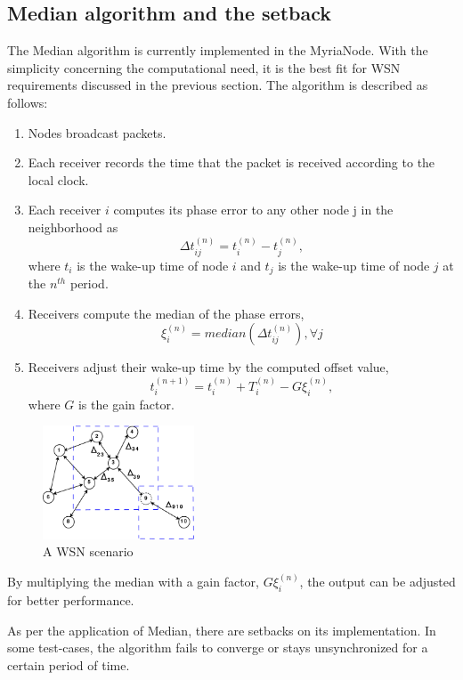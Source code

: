 \documentclass[journal]{IEEEtran}
\begin{document}
\subsection{\textbf{Median algorithm and the setback}}
\par The Median algorithm is currently implemented in the MyriaNode. With the simplicity concerning the computational need, it is the best fit for WSN requirements discussed in the previous section.
The algorithm is described as follows:
\begin{enumerate}
\item Nodes broadcast packets.
\item Each receiver records the time that the packet is received according to the local clock.
\item Each receiver $i$ computes its phase error to
any other node j in the neighborhood as
\begin{equation}
\Delta t_{ij}^{(n)} = t_i^{(n)} - t_j^{(n)} ,
\end{equation}
where $t_i$ is the wake-up time of node $i$ and $t_j$ is the wake-up
time of node $j$ at the $n^{th}$ period.
\item Receivers compute the median of the phase errors,
\begin{equation}
\xi_i^{(n)} = median(\Delta t_{ij}^{(n)}) , \forall j
\end{equation}
\item Receivers adjust their wake-up time by the computed offset value,
\begin{equation}
t_{i}^{(n+1)} = t_i^{(n)} + T_i^{(n)} - G\xi_i^{(n)},
\end{equation}
where $G$ is the gain factor.
\end{enumerate}
\begin{figure}[b]
\centering
\includegraphics[width=0.4\textwidth]{node_field}
\caption{A WSN scenario} \label{wsn}
\end{figure}
By multiplying the median with a gain factor, $G\xi_i^{(n)}$, the output can be adjusted for better performance.
\par As per the application of Median, there are setbacks on its implementation. In some test-cases, the algorithm fails to converge or stays unsynchronized for a certain period of time.
\end{document}

